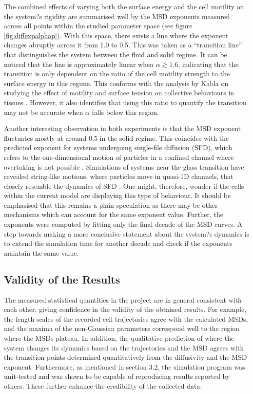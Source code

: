 \documentclass[a4paper,12pt]{article}
\begin{document}
The combined effects of varying both the surface energy and the cell motility on the system?s rigidity are summarised well by the MSD exponents measured across all points within the studied parameter space (see figure \ref{fig:diffexpalphap}). With this space, there exists a line where the exponent changes abruptly across it from 1.0 to 0.5. This was taken as a ``transition line'' that distinguishes the system between the fluid and solid regime. It can be noticed that the line is approximately linear when $\alpha \gtrsim 1.6$, indicating that the transition is only dependent on the ratio of the cell motility strength to the surface energy in this regime. This conforms with the analysis by Kabla on studying the effect of motility and surface tension on collective behaviours in tissues \cite{kabla2012}. However, it also identifies that using this ratio to quantify the transition may not be accurate when $\alpha$ falls below this region.  

Another interesting observation in both experiments is that the MSD exponent fluctuates mostly at around 0.5 in the solid regime.  This coincides with the predicted exponent for systems undergoing single-file diffusion (SFD), which refers to the one-dimensional motion of particles in a confined channel where overtaking is not possible \cite{levitt1973}. Simulations of systems near the glass transition have revealed string-like motions, where particles move in quasi-1D channels, that closely resemble the dynamics of SFD \cite{donati1998}. One might, therefore, wonder if the cells within the current model are displaying this type of behaviour. It should be emphasised that this remains a plain speculation as there may be other mechanisms which can account for the same exponent value. Further, the exponents were computed by fitting only the final decade of the MSD curves. A step towards making a more conclusive statement about the system?s dynamics is to extend the simulation time for another decade and check if the exponents maintain the same value. 


\subsection{Validity of the Results}
The measured statistical quantities in the project are in general consistent with each other, giving confidence in the validity of the obtained results. For example, the length scales of the recorded cell trajectories agree with the calculated MSDs, and the maxima of the non-Gaussian parameters correspond well to the region where the MSDs plateau. In addition, the qualitative prediction of where the system changes its dynamics based on the trajectories and the MSD agrees with the transition points determined quantitatively from the diffusivity and the MSD exponent. Furthermore, as mentioned in section 3.2, the simulation program was unit-tested and was shown to be capable of reproducing results reported by others. These further enhance the credibility of the collected data. 
\end{document}
